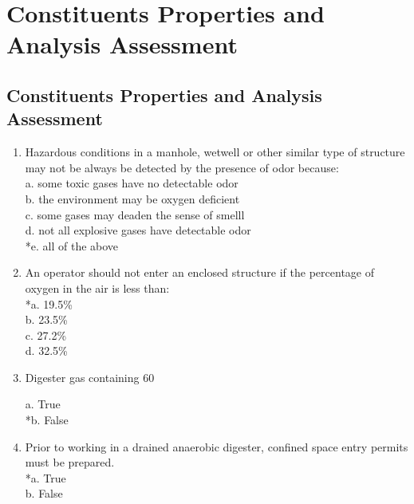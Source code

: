 
\chapter{Constituents Properties and Analysis Assessment}

\section*{Constituents Properties and Analysis Assessment}

\begin{enumerate}

\item Hazardous conditions in a manhole, wetwell or other similar type of structure may not be always be detected by the presence of odor because:\\

a. some toxic gases have no detectable odor \\
b. the environment may be oxygen deficient \\
c. some gases may deaden the sense of smelll \\
d. not all explosive gases have detectable odor \\
*e. all of the above \\

\item An operator should not enter an enclosed structure if the percentage of oxygen in the air is less than:\\

*a. 19.5\% \\
b. 23.5\% \\
c. 27.2\% \\
d. 32.5\% \\

\item Digester gas containing 60%

a. True \\
*b. False \\

\item Prior to working in a drained anaerobic digester, confined space entry permits must be prepared.\\

*a. True \\
b. False \\


\end{enumerate}
